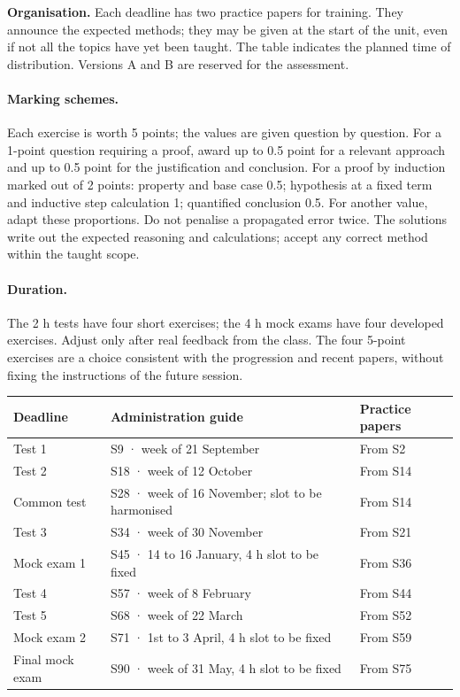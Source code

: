 \textbf{Organisation.} Each deadline has two practice papers for training. They announce the expected methods; they may be given at the start of the unit, even if not all the topics have yet been taught. The table indicates the planned time of distribution. Versions A and B are reserved for the assessment.
\ifmxteacher
\paragraph{Marking schemes.} Each exercise is worth 5 points; the values are given question by question. For a 1-point question requiring a proof, award up to 0.5 point for a relevant approach and up to 0.5 point for the justification and conclusion. For a proof by induction marked out of 2 points: property and base case 0.5; hypothesis at a fixed term and inductive step calculation 1; quantified conclusion 0.5. For another value, adapt these proportions. Do not penalise a propagated error twice. The solutions write out the expected reasoning and calculations; accept any correct method within the taught scope.
\paragraph{Duration.} The 2 h tests have four short exercises; the 4 h mock exams have four developed exercises. Adjust only after real feedback from the class. The four 5-point exercises are a choice consistent with the progression and recent papers, without fixing the instructions of the future session.
\fi
\begin{longtable}{@{}p{}p{}p{}@{}}\toprule\textbf{Deadline}&\textbf{Administration guide}&\textbf{Practice papers}\\\midrule\endhead


Test 1&S9 · week of 21 September&From S2\\[3pt]

Test 2&S18 · week of 12 October&From S14\\[3pt]

Common test&S28 · week of 16 November; slot to be harmonised&From S14\\[3pt]

Test 3&S34 · week of 30 November&From S21\\[3pt]

Mock exam 1&S45 · 14 to 16 January, 4 h slot to be fixed&From S36\\[3pt]

Test 4&S57 · week of 8 February&From S44\\[3pt]

Test 5&S68 · week of 22 March&From S52\\[3pt]

Mock exam 2&S71 · 1st to 3 April, 4 h slot to be fixed&From S59\\[3pt]

Final mock exam&S90 · week of 31 May, 4 h slot to be fixed&From S75\\[3pt]

\bottomrule\end{longtable}

